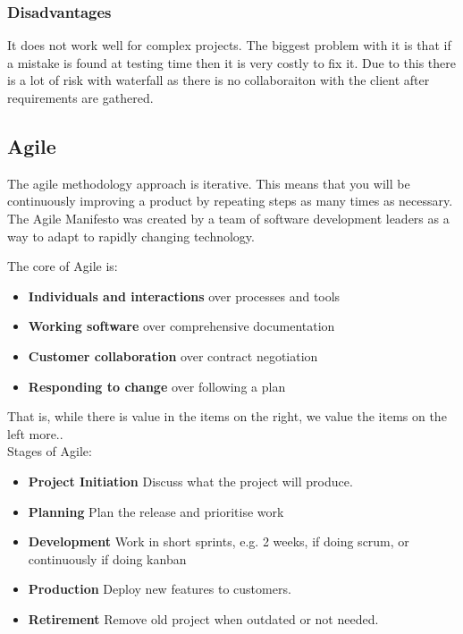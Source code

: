 \documentclass{article}
\begin{document}
\subsubsection{Disadvantages}
It does not work well for complex projects. The biggest problem with it is that if a mistake is found at testing time then it is very costly to fix it. Due to this there is a lot of risk with waterfall as there is no collaboraiton with the client after requirements are gathered.

\subsection{Agile}
The agile methodology approach is iterative. This means that you will be continuously improving a product by repeating steps as many times as necessary. The Agile Manifesto was created by a team of software development leaders as a way to adapt to rapidly changing technology. 

The core of Agile is:

\begin{itemize}
    \item \textbf{Individuals and interactions} \small over processes and tools \normalsize
    \item \textbf{Working software} \small over comprehensive documentation \normalsize
    \item \textbf{Customer collaboration} \small over contract negotiation \normalsize
    \item \textbf{Responding to change} \small over following a plan\normalsize
\end{itemize}

That is, while there is value in the items on the right, we value the items on the left more.\cite{manifesto}.\\

Stages of Agile:
\begin{itemize}
    \item \textbf{Project Initiation} Discuss what the project will produce.
    \item \textbf{Planning} Plan the release and prioritise work
    \item \textbf{Development} Work in short sprints, e.g. 2 weeks, if doing scrum, or continuously if doing kanban
    \item \textbf{Production} Deploy new features to customers.
    \item \textbf{Retirement} Remove old project when outdated or not needed.
\end{itemize}
\end{document}

